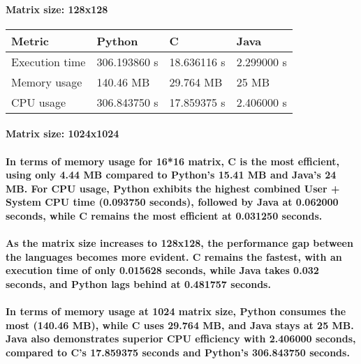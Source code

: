 \documentclass{article}
\begin{document}
\paragraph{Matrix size: 128x128}

\hfill 
\newline
\hfill 
\newline

\begin{tabular}{| l | l | l | l |}
\hline
Metric & Python & C & Java \\ \hline
Execution time & 306.193860 s & 18.636116 s & 2.299000 s \\ \hline
Memory usage & 140.46 MB & 29.764 MB & 25 MB \\ \hline
CPU usage & 306.843750 s & 17.859375 s & 2.406000 s \\
\hline
\end{tabular}
\paragraph{Matrix size: 1024x1024}


\hfill 
\newline
\hfill 
\newline


\hfill 
\newline


\paragraph{In terms of memory usage for 16*16 matrix, C is the most efficient, using only 4.44 MB compared to Python's 15.41 MB and Java's 24 MB. For CPU usage, Python exhibits the highest combined User + System CPU time (0.093750 seconds), followed by Java at 0.062000 seconds, while C remains the most efficient at 0.031250 seconds.}

\paragraph{As the matrix size increases to 128x128, the performance gap between the languages becomes more evident. C remains the fastest, with an execution time of only 0.015628 seconds, while Java takes 0.032 seconds, and Python lags behind at 0.481757 seconds.}

\paragraph{In terms of memory usage at 1024 matrix size, Python consumes the most (140.46 MB), while C uses 29.764 MB, and Java stays at 25 MB. Java also demonstrates superior CPU efficiency with 2.406000 seconds, compared to C’s 17.859375 seconds and Python’s 306.843750 seconds.}
\end{document}
